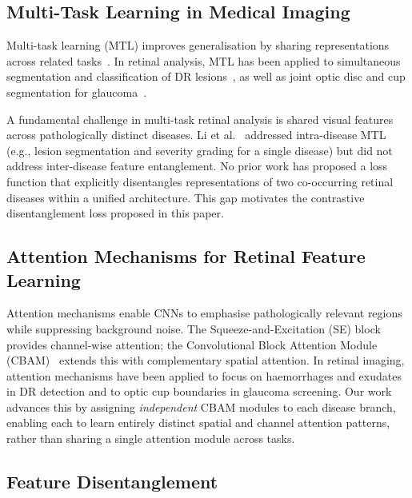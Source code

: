 \documentclass[review,12pt]{elsarticle}
\begin{document}
\subsection{Multi-Task Learning in Medical Imaging}

Multi-task learning (MTL) improves generalisation by sharing representations
across related tasks~\cite{crawshaw2020}. In retinal analysis, MTL has been
applied to simultaneous segmentation and classification of DR
lesions~\cite{li2019}, as well as joint optic disc and cup
segmentation for glaucoma~\cite{fu2018}.

A fundamental challenge in multi-task retinal analysis is shared visual
features across pathologically distinct diseases. Li et al.~\cite{li2019}
addressed intra-disease MTL (e.g., lesion segmentation and severity grading
for a single disease) but did not address inter-disease feature entanglement.
No prior work has proposed a loss function that explicitly disentangles
representations of two co-occurring retinal diseases within a unified
architecture. This gap motivates the contrastive disentanglement loss proposed
in this paper.

\subsection{Attention Mechanisms for Retinal Feature Learning}

Attention mechanisms enable CNNs to emphasise pathologically relevant regions
while suppressing background noise. The Squeeze-and-Excitation (SE)
block~\cite{hu2018} provides channel-wise attention; the Convolutional Block
Attention Module (CBAM)~\cite{woo2018} extends this with complementary spatial
attention. In retinal imaging, attention mechanisms have been applied to
focus on haemorrhages and exudates in DR detection and to optic cup boundaries
in glaucoma screening. Our work advances this by assigning \textit{independent}
CBAM modules to each disease branch, enabling each to learn entirely distinct
spatial and channel attention patterns, rather than sharing a single attention
module across tasks.

\subsection{Feature Disentanglement}
\end{document}
